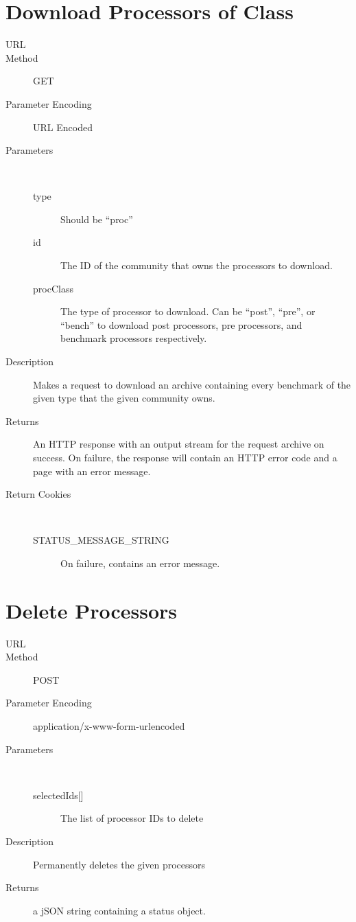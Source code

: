 \section{Download Processors of Class}
\begin{description}
\item [URL] 
\item [Method] GET
\item [Parameter Encoding] URL Encoded
\item [Parameters] \
	\begin{description}
	\item [type]  Should be “proc”
	\item [id]  The ID of the community that owns the processors to download.
	\item [procClass] \type{Integer} The type of processor to download. Can be “post”, “pre”, or “bench” to download post processors, pre processors, and benchmark processors respectively.
	\end{description}
\item [Description] Makes a request to download an archive containing every benchmark of the given type that the given community owns.
\item [Returns] An HTTP response with an output stream for the request archive on success. On failure, the response will contain an HTTP error code and a page with an error message.
\item [Return Cookies] \
	\begin{description}
	\item [STATUS\_MESSAGE\_STRING]  On failure, contains an error message.
	\end{description}
\end{description}


\section{Delete Processors}
\begin{description}
\item [URL] 
\item [Method] POST
\item [Parameter Encoding] application/x-www-form-urlencoded
\item [Parameters] \
	\begin{description}
	\item [{selectedIds[]}] \type{Integer List} The list of processor IDs to delete
	\end{description}
\item [Description] Permanently deletes the given processors
\item [Returns] a jSON string containing a status object.
\end{description}
